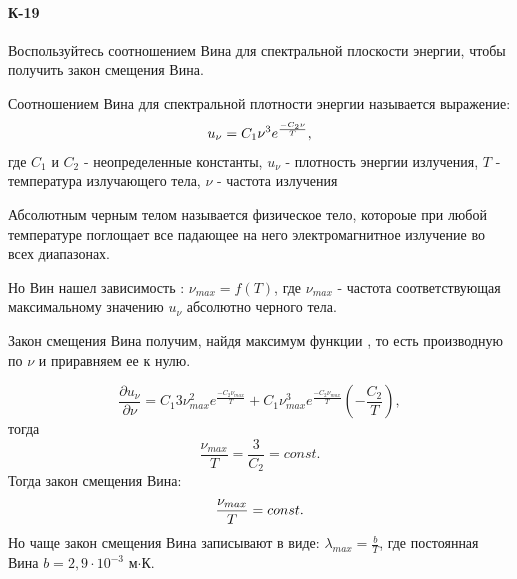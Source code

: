 \documentclass[__main__.tex]{subfiles}
\begin{document}
\paragraph{К-19}
Воспользуйтесь соотношением Вина для спектральной плоскости энергии, чтобы получить закон смещения Вина.
\begin{definition}
	Соотношением Вина для спектральной плотности энергии называется выражение: 
	\begin{gather}
		\llabel{29/1}
		u_{\nu}=C_{1}\nu^{3}e^{\frac{-C_{2}\nu}{T}},
	\end{gather}
	где $C_{1}$ и $C_{2}$ - неопределенные константы, $u_{\nu}$ - плотность энергии излучения, $T$ - температура излучающего тела, $\nu$ - частота излучения
\end{definition}

\begin{definition}
	Абсолютным черным телом называется физическое тело, котороые при любой температуре поглощает все падающее на него электромагнитное излучение во всех диапазонах.
\end{definition}
Но Вин нашел зависимость : $\nu_{max} = f(T)$, где $\nu_{max}$ - частота соответствующая максимальному значению $u_{\nu}$ абсолютно черного тела.

Закон смещения Вина получим, найдя максимум функции , то есть производную по $\nu$ и приравняем ее к нулю.

$$
\frac {\partial u_{\nu}}{\partial \nu}= C_{1}3\nu_{max}^{2}e^{\frac{-C_{2}\nu_{max}}{T}}+
C_{1}\nu_{max}^{3}e^{\frac{-C_{2}\nu_{max}}{T}}(-\frac{C_{2}}{T}),
$$
тогда
$$
\frac{\nu_{max}}{T}=\frac{3}{C_{2}}=const.
$$
Тогда закон смещения Вина:
\begin{gather}
	\llabel{goof}
	\frac{\nu_{max}}{T}=const.
\end{gather}
Но чаще закон смещения Вина записывают в виде: $\lambda_{max}=\frac{b}{T}$, где постоянная Вина $b=2,9\cdot10^{-3}$ м$\cdot$К. 
\end{document}
